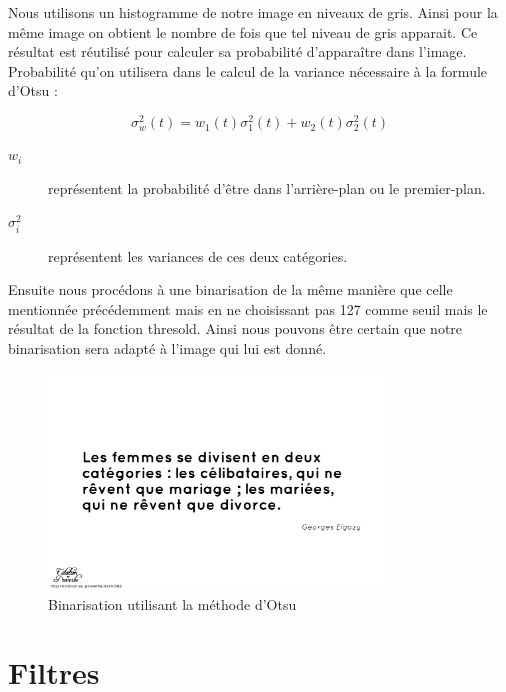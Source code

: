 \documentclass[11pt]{report}
\begin{document}
Nous utilisons un histogramme de notre image en niveaux de gris. Ainsi pour la même image on obtient le nombre de fois que tel niveau de gris apparait. Ce résultat est réutilisé pour calculer sa probabilité d’apparaître dans l’image. Probabilité qu’on utilisera dans le calcul de la variance nécessaire à la formule d’Otsu :

\[ \sigma ^{2}_{w} \left( t\right) = w_{1}\left( t\right) \sigma ^{2}_{1}\left( t\right) + w_{2}\left( t\right) \sigma ^{2}_{2}\left( t\right) \]

\begin{description}
\item[$w_{i}$] représentent la probabilité d'être dans l'arrière-plan ou le premier-plan.
\item[$\sigma ^{2}_{i}$] représentent les variances de ces deux catégories.
\end{description}

\medskip

Ensuite nous procédons à une binarisation de la même manière que celle mentionnée précédemment mais en ne choisissant pas 127 comme seuil mais le résultat de la fonction thresold. Ainsi nous pouvons être certain que notre binarisation sera adapté à l’image qui lui est donné.

\begin{figure}[htbp]
\centering
\includegraphics[width=9cm]{b_otsu.png}
\caption{Binarisation utilisant la méthode d'Otsu}
\end{figure}

\section{Filtres}

\end{document}

